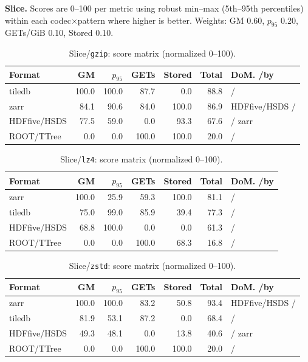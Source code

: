 \documentclass[nomenclature, english, bibtex]{kththesis}
\numberwithin{listing}{chapter}
\begin{document}
\textbf{Slice.} Scores are 0–100 per metric using robust min–max (5th–95th percentiles) within each codec$\times$pattern where higher is better. Weights: \gls{GM} 0.60, $p_{95}$ 0.20, GETs/GiB 0.10, Stored 0.10.

\begin{table}[H]
  \centering
  \caption{Slice/\texttt{gzip}: score matrix (normalized 0–100).}
  \label{tab:scores-slice-gzip}
  \begin{tabular}{lrrrrrl}
    \toprule
    Format & \gls{GM} & $p_{95}$ & GETs & Stored & Total & \gls{DoM}. /by \\
    \midrule
    tiledb & 100.0 & 100.0 & 87.7 & 0.0  & 88.8 & / \\
    zarr   & 84.1  & 90.6  & 84.0 & 100.0 & 86.9 & \gls{HDFfive}/\gls{HSDS} / \\
    \gls{HDFfive}/\gls{HSDS}   & 77.5  & 59.0  & 0.0  & 93.3  & 67.6 & / zarr \\
    \gls{ROOT}/\gls{TTree}   & 0.0   & 0.0   & 100.0& 100.0 & 20.0 & / \\
    \bottomrule
  \end{tabular}
\end{table}

\begin{table}[H]
  \centering
  \caption{Slice/\texttt{lz4}: score matrix (normalized 0–100).}
  \label{tab:scores-slice-lz4}
  \begin{tabular}{lrrrrrl}
    \toprule
    Format & \gls{GM} & $p_{95}$ & GETs & Stored & Total & \gls{DoM}. /by \\
    \midrule
    zarr   & 100.0 & 25.9 & 59.3 & 100.0 & 81.1 & / \\
    tiledb & 75.0  & 99.0 & 85.9 & 39.4  & 77.3 & / \\
    \gls{HDFfive}/\gls{HSDS}   & 68.8  & 100.0& 0.0  & 0.0   & 61.3 & / \\
    \gls{ROOT}/\gls{TTree}   & 0.0   & 0.0  & 100.0& 68.3  & 16.8 & / \\
    \bottomrule
  \end{tabular}
\end{table}

\begin{table}[H]
  \centering
  \caption{Slice/\texttt{zstd}: score matrix (normalized 0–100).}
  \label{tab:scores-slice-zstd}
  \begin{tabular}{lrrrrrl}
    \toprule
    Format & \gls{GM} & $p_{95}$ & GETs & Stored & Total & \gls{DoM}. /by \\
    \midrule
    zarr   & 100.0 & 100.0 & 83.2 & 50.8 & 93.4 & \gls{HDFfive}/\gls{HSDS} / \\
    tiledb & 81.9  & 53.1  & 87.2 & 0.0  & 68.4 & / \\
    \gls{HDFfive}/\gls{HSDS}   & 49.3  & 48.1  & 0.0  & 13.8 & 40.6 & / zarr \\
    \gls{ROOT}/\gls{TTree}   & 0.0   & 0.0   & 100.0& 100.0& 20.0 & / \\
    \bottomrule
  \end{tabular}
\end{table}
\end{document}
